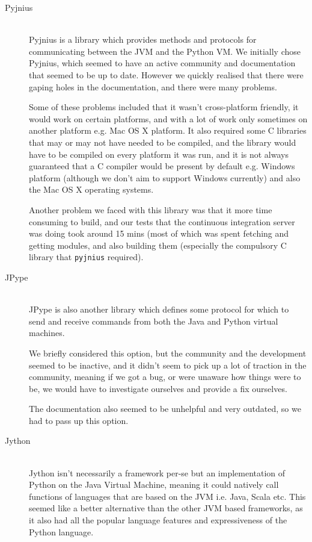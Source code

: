 \documentclass[11pt, a4paper]{article}
\begin{document}
\begin{description}
  \item[Pyjnius]\hfill\\
    Pyjnius is a library which provides methods and protocols for communicating
    between the JVM and the Python VM.  We initially chose Pyjnius, which seemed
    to have an active community and documentation that seemed to be up to
    date. However we quickly realised that there were gaping holes in the
    documentation, and there were many problems.

    Some of these problems included that it wasn't cross-platform friendly, it
    would work on certain platforms, and with a lot of work only sometimes on
    another platform e.g. Mac OS X platform. It also required some C libraries
    that may or may not have needed to be compiled, and the library would have
    to be compiled on every platform it was run, and it is not always guaranteed
    that a C compiler would be present by default e.g. Windows platform
    (although we don't aim to support Windows currently) and also the Mac OS X
    operating systems.

    Another problem we faced with this library was that it more time consuming
    to build, and our tests that the continuous integration server was doing
    took around 15 mins (most of which was spent fetching and getting modules,
    and also building them (especially the compulsory C library that
    \texttt{pyjnius} required).
  \item[JPype]\hfill\\
    JPype is also another library which defines some protocol for which to send
    and receive commands from both the Java and Python virtual machines.

    We briefly considered this option, but the community and the development
    seemed to be inactive, and it didn't seem to pick up a lot of traction in
    the community, meaning if we got a bug, or were unaware how things were to
    be, we would have to investigate ourselves and provide a fix ourselves.

    The documentation also seemed to be unhelpful and very outdated, so we had
    to pass up this option.
  \item[Jython]\hfill\\
    Jython isn't necessarily a framework per-se but an implementation of Python
    on the Java Virtual Machine, meaning it could natively call functions of
    languages that are based on the JVM i.e. Java, Scala etc. This seemed like a
    better alternative than the other JVM based frameworks, as it also had all
    the popular language features and expressiveness of the Python language.


\end{description}
\end{document}
